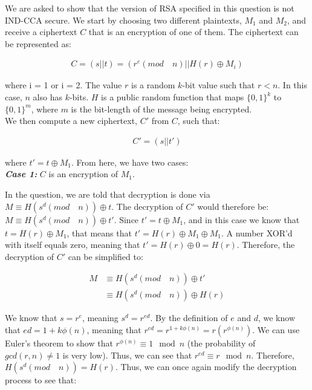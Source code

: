 \documentclass[11pt]{article}
\theoremstyle{definition}
\begin{document}
\begin{enumerate}
    We are asked to show that the version of RSA specified in this question is not IND-CCA secure. We start by choosing two different plaintexts, $M_1$ and $M_2$, and receive a ciphertext $C$ that is an encryption of one of them. The ciphertext can be represented as:
    
    \begin{align*}
        C = (s||t) = (r^e (mod \quad n) || H(r) \oplus M_i)
    \end{align*}
    
    where i = 1 or i = 2. The value $r$ is a random $k$-bit value such that $r < n$. In this case, $n$ also has $k$-bits. $H$ is a public random function that maps $\{0, 1\}^k$ to $\{0, 1\}^m$, where $m$ is the bit-length of the message being encrypted. \\
    
    We then compute a new ciphertext, $C'$ from $C$, such that:
    
    \begin{align*}
        C' = (s||t')
    \end{align*}
    
    where $t' = t \oplus M_1$. From here, we have two cases: \\
    
    \textbf{\textit{Case 1:}} $C$ is an encryption of $M_1$.
    
    In the question, we are told that decryption is done via $M \equiv H(s^d (mod \quad n)) \oplus t$. The decryption of $C'$ would therefore be: $M \equiv H(s^d (mod \quad n)) \oplus t'$. Since $t' = t \oplus M_1$, and in this case we know that $t = H(r) \oplus M_1$, that means that $t' = H(r) \oplus M_1 \oplus M_1$. A number XOR'd with itself equals zero, meaning that $t' = H(r) \oplus 0 = H(r)$. Therefore, the decryption of $C'$ can be simplified to: 
    
    \begin{align*}
        M &\equiv H(s^d (mod \quad n)) \oplus t' \\
        &\equiv H(s^d (mod \quad n)) \oplus H(r)
    \end{align*}
    
    We know that $s = r^e$, meaning $s^d = r^{ed}$. By the definition of $e$ and $d$, we know that $ed = 1 + k\phi{(n)}$, meaning that $r^{ed} = r^{1 + k\phi{(n)}} = r (r^{\phi{(n)}})$. We can use Euler's theorem to show that $r^{\phi{(n)}} \equiv 1 \mod{n}$ (the probability of $gcd(r, n) \neq 1$ is very low). Thus, we can see that $r^{ed} \equiv r \mod{n}$. Therefore, $H(s^d (mod \quad n)) = H(r)$. Thus, we can once again modify the decryption process to see that:
    

\end{enumerate}
\end{document}

